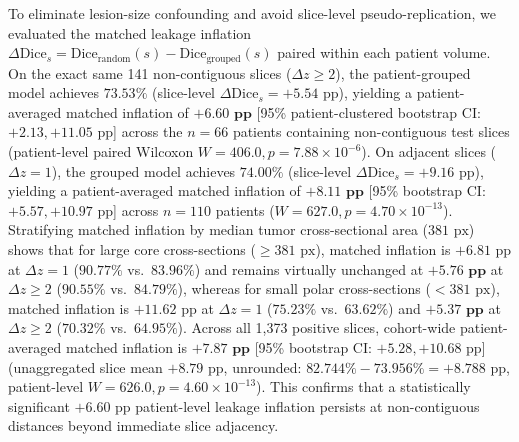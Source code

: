 \documentclass[11pt,a4paper]{article}
\begin{document}
To eliminate lesion-size confounding and avoid slice-level pseudo-replication, we evaluated the matched leakage inflation $\Delta\text{Dice}_s = \text{Dice}_{\text{random}}(s) - \text{Dice}_{\text{grouped}}(s)$ paired within each patient volume. On the exact same 141 non-contiguous slices ($\Delta z \ge 2$), the patient-grouped model achieves $73.53\%$ (slice-level $\Delta\text{Dice}_s = +5.54\text{ pp}$), yielding a patient-averaged matched inflation of $\mathbf{+6.60\text{ pp}}$ [95\% patient-clustered bootstrap CI: $+2.13, +11.05\text{ pp}$] across the $n = 66$ patients containing non-contiguous test slices (patient-level paired Wilcoxon $W = 406.0, p = 7.88 \times 10^{-6}$). On adjacent slices ($\Delta z = 1$), the grouped model achieves $74.00\%$ (slice-level $\Delta\text{Dice}_s = +9.16\text{ pp}$), yielding a patient-averaged matched inflation of $\mathbf{+8.11\text{ pp}}$ [95\% bootstrap CI: $+5.57, +10.97\text{ pp}$] across $n = 110$ patients ($W = 627.0, p = 4.70 \times 10^{-13}$). Stratifying matched inflation by median tumor cross-sectional area ($381\text{ px}$) shows that for large core cross-sections ($\ge 381\text{ px}$), matched inflation is $+6.81\text{ pp}$ at $\Delta z = 1$ ($90.77\%$ vs.\ $83.96\%$) and remains virtually unchanged at $\mathbf{+5.76\text{ pp}}$ at $\Delta z \ge 2$ ($90.55\%$ vs.\ $84.79\%$), whereas for small polar cross-sections ($< 381\text{ px}$), matched inflation is $+11.62\text{ pp}$ at $\Delta z = 1$ ($75.23\%$ vs.\ $63.62\%$) and $\mathbf{+5.37\text{ pp}}$ at $\Delta z \ge 2$ ($70.32\%$ vs.\ $64.95\%$). Across all 1,373 positive slices, cohort-wide patient-averaged matched inflation is $\mathbf{+7.87\text{ pp}}$ [95\% bootstrap CI: $+5.28, +10.68\text{ pp}$] (unaggregated slice mean $+8.79\text{ pp}$, unrounded: $82.744\% - 73.956\% = +8.788\text{ pp}$, patient-level $W = 626.0, p = 4.60 \times 10^{-13}$). This confirms that a statistically significant $+6.60\text{ pp}$ patient-level leakage inflation persists at non-contiguous distances beyond immediate slice adjacency.
\end{document}
